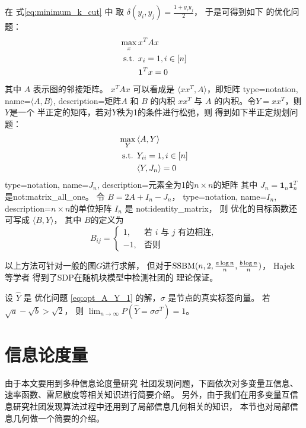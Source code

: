 在 式\eqref{eq:minimum_k_cut} 中
取 $\delta(y_i, y_j) = \frac{1+y_iy_j}{2}$，
于是可得到如下
的优化问题：
\begin{align}
  \max_x\, &  x^T A x \notag \\
  \textrm{s.t. } & x_{i} = 1, i \in [n] \notag \\
  & \mathbf{1}^T x = 0
\end{align}
其中 $A$ 表示图的邻接矩阵。
$ x^T A x $ 可以看成是 $\langle xx^T, A \rangle $，即矩阵
{
  type=notation,
  name={$\langle A, B \rangle $},
  description={矩阵$A$ 和 $B$ 的内积}
}
$xx^T$ 与 $A$ 的内积。令$Y=xx^T$，则$Y$是一个
半正定的矩阵，若对$Y$秩为1的条件进行松弛，则
得到如下半正定规划问题：
\begin{align}\label{eq:opt_A_Y_1}
  \max_Y\, & \langle A, Y \rangle  \notag \\
  \textrm{s.t. } & Y_{ii} = 1, i \in [n] \notag \\
  & \langle Y, J_n \rangle  = 0
\end{align}
{
  type=notation,
  name={$J_n$},
  description={元素全为1的$n\times n$的矩阵}
}
其中 $J_n=\mathbf{1}_n\mathbf{1}_n^T$
是\glsdesc{not:matrix_all_one}。
令 $B=2A + I_n - J_n$，
{
  type=notation,
  name={$I_n$},
  description={$n\times n$的单位矩阵}
}
$I_n$ 是 \glsdesc{not:identity_matrix}，
则
优化的目标函数还可写成 $ \langle B, Y \rangle $，
其中 $B$的定义为
\begin{equation}\label{eq:def_B_sdp}
    B_{ij} = \begin{cases}
        1, & \text{若 $i$ 与 $j$ 有边相连}, \\
        -1,& \text{否则}
    \end{cases}
\end{equation}  

以上方法可针对一般的图$G$进行求解，
但对于$\operatorname{SSBM}(n,2, \frac{a \log n}{n}, \frac{b \log n}{n})$，
Hajek 等学者 \cite{hajek2016achieving} 得到了SDP在随机块模型中检测社团的
理论保证。
\begin{theorem}
  设 $\hat{Y}$ 是
  优化问题 \eqref{eq:opt_A_Y_1} 的解，$\sigma$ 是节点的真实标签向量。
  若 $\sqrt{a} - \sqrt{b}
  > \sqrt{2}$，
  则
  $\lim_{n\to\infty} P(\hat{Y}=\sigma\sigma^T)=1$。
\end{theorem}
\section{信息论度量}
由于本文要用到多种信息论度量研究
社团发现问题，下面依次对多变量互信息、速率函数、雷尼散度等相关知识进行简要介绍。
另外，由于我们在用多变量互信息研究社团发现算法过程中还用到了局部信息几何相关的知识，
本节也对局部信息几何做一个简要的介绍。
